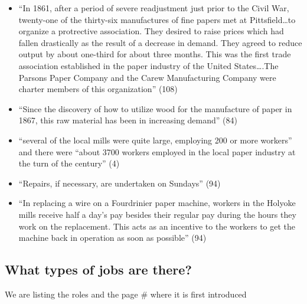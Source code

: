 \documentclass[
  letterpaper,
  DIV=11,
  numbers=noendperiod]{scrartcl}
\begin{document}
\begin{itemize}
\item
  ``In 1861, after a period of severe readjustment just prior to the
  Civil War, twenty-one of the thirty-six manufactures of fine papers
  met at Pittsfield\ldots to organize a protrective association. They
  desired to raise prices which had fallen drastically as the result of
  a decrease in demand. They agreed to reduce output by about one-third
  for about three months. This was the first trade association
  established in the paper industry of the United States\ldots.The
  Parsons Paper Company and the Carew Manufacturing Company were charter
  members of this organization'' (108)
\item
  ``Since the discovery of how to utilize wood for the manufacture of
  paper in 1867, this raw material has been in increasing demand'' (84)
\item
  ``several of the local mills were quite large, employing 200 or more
  workers'' and there were ``about 3700 workers employed in the local
  paper industry at the turn of the century'' (4)
\item
  ``Repairs, if necessary, are undertaken on Sundays'' (94)
\item
  ``In replacing a wire on a Fourdrinier paper machine, workers in the
  Holyoke mills receive half a day's pay besides their regular pay
  during the hours they work on the replacement. This acts as an
  incentive to the workers to get the machine back in operation as soon
  as possible'' (94)
\end{itemize}

\hypertarget{what-types-of-jobs-are-there}{%
\subsection{What types of jobs are
there?}\label{what-types-of-jobs-are-there}}

We are listing the roles and the page \# where it is first introduced
\end{document}
